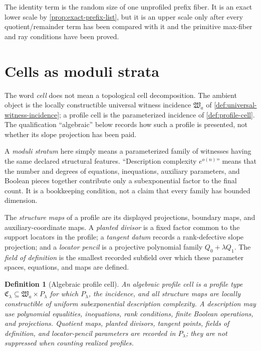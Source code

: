 \documentclass[12pt,a4paper]{amsart}
\numberwithin{equation}{section}
\newtheorem{definition}[definition]{Definition}
\theoremstyle{remark}
\begin{document}
The identity term is the random size of one unprofiled prefix fiber.  It is
an exact lower scale by \cref{prop:exact-prefix-list}, but it is an upper
scale only after every quotient/remainder term has been compared with it and
the primitive max-fiber and ray conditions have been proved.

\section{Cells as moduli strata}\label{sec:cells}

The word \emph{cell} does not mean a topological cell decomposition.  The
ambient object is the locally constructible universal witness incidence
\(\mathfrak W_a\) of \cref{def:universal-witness-incidence}; a profile
cell is the parameterized incidence of \cref{def:profile-cell}.  The
qualification ``algebraic'' below records how such a profile is presented,
not whether its slope projection has been paid.

A \emph{moduli stratum} here simply means a parameterized family of
witnesses having the same declared structural features.  ``Description
complexity \(e^{o(n)}\)'' means that the number and degrees of equations,
inequations, auxiliary parameters, and Boolean pieces together contribute
only a subexponential factor to the final count.  It is a bookkeeping
condition, not a claim that every family has bounded dimension.

The \emph{structure maps} of a profile are its displayed projections,
boundary maps, and auxiliary-coordinate maps.  A \emph{planted divisor}
is a fixed factor common to the support locators in the profile; a
\emph{tangent datum} records a rank-defective slope projection; and a
\emph{locator pencil} is a projective polynomial family
\(Q_0+\lambda Q_1\).  The \emph{field of definition} is the smallest
recorded subfield over which these parameter spaces, equations, and maps
are defined.

\begin{definition}[Algebraic profile cell]\label{def:cell}
An \emph{algebraic profile cell} is a profile type
\(\mathfrak C_\lambda\subseteq\mathfrak W_a\times P_\lambda\) for which
\(P_\lambda\), the incidence, and all structure maps are locally
constructible of uniform subexponential description complexity.  A
description may use polynomial equalities, inequations, rank conditions,
finite Boolean operations, and projections.  Quotient maps, planted
divisors, tangent points, fields of definition, and locator-pencil
parameters are recorded in \(P_\lambda\); they are not suppressed when
counting realized profiles.
\end{definition}
\end{document}
